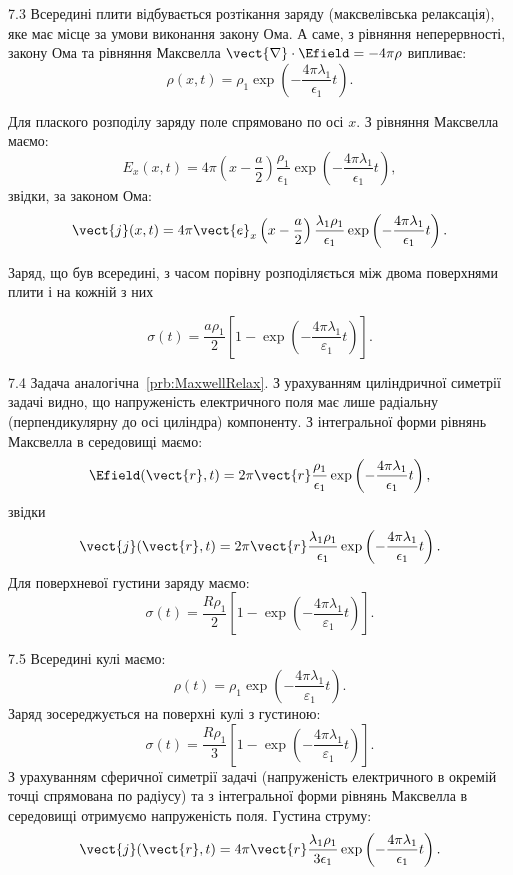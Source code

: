 \begin{Solution}{7.{3}}
	Всередині плити відбувається розтікання заряду (максвелівська релаксація), яке має місце за умови виконання закону Ома. А саме, з рівняння неперервності, закону Ома та рівняння Максвелла $\vect{\nabla}\cdot\Efield = -4\pi\rho$   випливає:
	\[
		\rho (x,t) = \rho_1\exp \left(  - \frac{4\pi \lambda _1}{\epsilon _1}t \right).
	\]

	Для плаского розподілу заряду поле спрямовано по осі $x$. З рівняння Максвелла маємо:
	\[
		E_x(x,t) = 4\pi \left( {x - \frac{a}{2}} \right)\frac{{{\rho_1}}}{{{\epsilon _1}}}\exp \left( { - \frac{{4\pi {\lambda _1}}}{{{\epsilon_1}}}t} \right),
	\]
	звідки, за законом Ома:
	\[
		\vect{j}(x,t) = 4\pi \vect{e}_x\left( x - \frac{a}{2} \right)\frac{\lambda _1\rho _1}{\epsilon _1}\exp \left( - \frac{4\pi\lambda_1}{\epsilon_1}t \right).
	\]

	Заряд, що був всередині, з часом порівну розподіляється між двома поверхнями плити і на кожній з них

	\[
		\sigma (t) = \frac{a\rho_1}{2}\left[ {1 - \exp \left( { - \frac{{4\pi {\lambda _1}}}{{{\varepsilon _1}}}t} \right)} \right].
	\]
\end{Solution}
\begin{Solution}{7.{4}}
	Задача аналогічна~\ref{prb:MaxwellRelax}. З урахуванням циліндричної симетрії задачі видно, що напруженість електричного поля має лише радіальну (перпендикулярну до осі циліндра) компоненту. З інтегральної форми рівнянь Максвелла в середовищі маємо:
	\[
		\Efield({\vect{r}},t) = 2\pi {\vect{r}}\frac{{{\rho _1}}}{{{\epsilon _1}}}\exp \left( { - \frac{{4\pi {\lambda _1}}}{{{\epsilon_1}}}t} \right),
	\]
	звідки
	\[
		\vect{j}(\vect{r},t) = 2\pi \vect{r}\frac{{{\lambda_1}{\rho_1}}}{{{\epsilon_1}}}\exp \left( { - \frac{{4\pi {\lambda _1}}}{{{\epsilon _1}}}t} \right).
	\]
	Для поверхневої густини заряду маємо:
	\[
		\sigma (t) = \frac{{R{\rho _1}}}{2}\left[ {1 - \exp \left( { - \frac{{4\pi {\lambda _1}}}{{{\varepsilon _1}}}t} \right)} \right].
	\]
\end{Solution}
\begin{Solution}{7.{5}}
	Всередині кулі маємо:
	\[
		\rho (t) = {\rho _1}\exp \left( { - \frac{{4\pi {\lambda_1}}}{{{\varepsilon _1}}}t} \right).
	\]
	Заряд зосереджується на поверхні кулі з густиною:
	\[
		\sigma (t) = \frac{{R{\rho _1}}}{3}\left[ {1 - \exp \left( { - \frac{{4\pi {\lambda _1}}}{{{\varepsilon _1}}}t} \right)} \right].
	\]
	З урахуванням сферичної симетрії задачі (напруженість електричного в окремій точці спрямована по радіусу) та з інтегральної форми рівнянь Максвелла в середовищі отримуємо напруженість поля. Густина струму:
	\[
		\vect{j}(\vect{r},t) = 4\pi \vect{r}\frac{{{\lambda_1}{\rho _1}}}{{3{\epsilon _1}}}\exp \left( { - \frac{{4\pi {\lambda_1}}}{{{\epsilon _1}}}t} \right).
	\]
\end{Solution}
